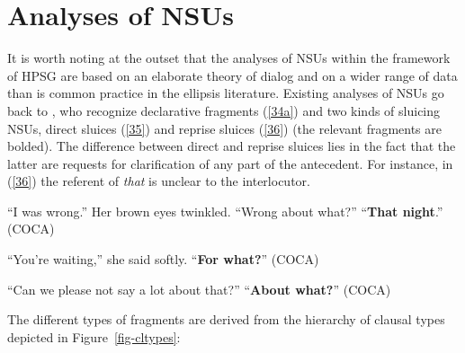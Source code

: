 {\section{Analyses of NSUs}
\label{sec-analyses-of-NSUs}

It is worth noting at the outset that the analyses of NSUs within the framework of HPSG are based on an elaborate theory of dialog \citep{Ginzburg1994, Ginzburg2004, Ginzburg2014a, Larsson2002, Purver2006, Fernandez2006, Fernandez2002, Fernandez2007, Ginzburg2010, Ginzburg2014b, Ginzburg2012, Ginzburg2013, Kim2019} and on a wider range of data than is common practice in the ellipsis literature. Existing analyses of NSUs go back to \citet{Ginzburg:Sag:2000}, who recognize declarative fragments (\ref{34a}) and two kinds of sluicing NSUs, direct sluices (\ref{35}) and reprise sluices (\ref{36}) (the relevant fragments are bolded). The difference between direct and reprise sluices lies in the fact that the latter are requests for clarification of any part of the antecedent. For instance, in (\ref{36}) the referent of \textit{that} is unclear to the interlocutor.

\ea ``I was wrong.'' Her brown eyes twinkled. ``Wrong about what?'' ``\textbf{That night}.'' (COCA) \label{34a}\z

\ea ``You're waiting,'' she said softly. ``\textbf{For what?}'' (COCA) \label{35} \z

\ea ``Can we please not say a lot about that?'' ``\textbf{About what?}'' (COCA) \label{36} \z


The different types of fragments are derived from the \citet[333]{Ginzburg:Sag:2000} hierarchy of clausal types depicted in Figure~\ref{fig-cltypes}:


}
